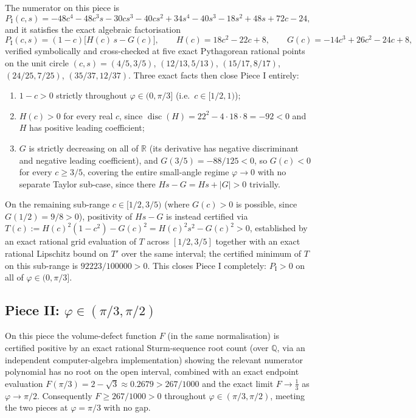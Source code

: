 \documentclass[11pt,reqno]{amsart}
\renewcommand{\_}{\origunderscore\allowbreak}
\numberwithin{equation}{section}
\theoremstyle{plain}
\theoremstyle{definition}
\theoremstyle{remark}
\newcommand{\tilt}{\varphi}                  %
\begin{document}
The numerator on this piece is
\[
  P_{\mathrm I}(c,s) = -48c^4-48c^3s-30cs^3-40cs^2+34s^4-40s^3-18s^2+48s+72c-24,
\]
and it satisfies the exact algebraic factorisation
\[
  P_{\mathrm I}(c,s) = (1-c)\bigl[H(c)\,s - G(c)\bigr], \qquad
  H(c)=18c^2-22c+8, \qquad G(c)=-14c^3+26c^2-24c+8,
\]
verified symbolically and cross-checked at five exact Pythagorean
rational points on the unit circle $(c,s)=(4/5,3/5)$, $(12/13,5/13)$,
$(15/17,8/17)$, $(24/25,7/25)$, $(35/37,12/37)$. Three exact facts then
close Piece I entirely:
\begin{enumerate}[label=(\roman*)]
\item $1-c>0$ strictly throughout $\tilt\in(0,\pi/3]$ (i.e.\ $c\in[1/2,1)$);
\item $H(c)>0$ for every real $c$, since $\operatorname{disc}(H)=22^2-4\cdot18\cdot8=-92<0$
  and $H$ has positive leading coefficient;
\item $G$ is strictly decreasing on all of $\mathbb R$ (its derivative
  has negative discriminant and negative leading coefficient), and
  $G(3/5)=-88/125<0$, so $G(c)<0$ for every $c\ge3/5$, covering the
  entire small-angle regime $\tilt\to0$ with no separate Taylor
  sub-case, since there $Hs-G=Hs+|G|>0$ trivially.
\end{enumerate}
On the remaining sub-range $c\in[1/2,3/5)$ (where $G(c)>0$ is possible,
since $G(1/2)=9/8>0$), positivity of $Hs-G$ is instead certified via
$T(c):=H(c)^2(1-c^2)-G(c)^2=H(c)^2s^2-G(c)^2>0$, established by an
exact rational grid evaluation of $T$ across $[1/2,3/5]$ together with
an exact rational Lipschitz bound on $T'$ over the same interval; the
certified minimum of $T$ on this sub-range is $92223/100000>0$. This
closes Piece I completely: $P_{\mathrm I}>0$ on all of $\tilt\in(0,\pi/3]$.

\subsection*{Piece II: \texorpdfstring{$\tilt\in(\pi/3,\pi/2)$}{theta in (pi/3, pi/2)}}

On this piece the volume-defect function $F$ (in the same normalisation)
is certified positive by an exact rational Sturm-sequence root count
(over $\mathbb Q$, via an independent computer-algebra implementation)
showing the relevant numerator polynomial has no root on the open
interval, combined with an exact endpoint evaluation
$F(\pi/3)=2-\sqrt3\approx0.2679>267/1000$ and the exact limit
$F\to\tfrac13$ as $\tilt\to\pi/2$. Consequently $F\ge267/1000>0$
throughout $\tilt\in(\pi/3,\pi/2)$, meeting the two pieces at
$\tilt=\pi/3$ with no gap.
\end{document}
